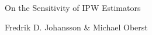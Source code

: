 \documentclass[11pt,a4paper]{article}
\begin{document}


\begin{center}
{\LARGE{On the Sensitivity of IPW Estimators}}

\vspace{3mm}
{\Large Fredrik D. Johansson \& Michael Oberst}
\vspace{3mm}
\end{center}







\end{document}

